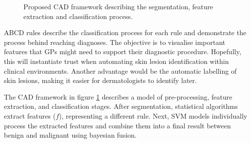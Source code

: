 \begin{figure}
\caption{Proposed CAD framework describing the segmentation, feature extraction  and classification process.} \label{model}
\end{figure}

ABCD rules describe the classification process for each rule and demonstrate the process behind reaching diagnoses. The objective is to visualise important features that GPs might need to support their diagnostic procedure. Hopefully, this will instantiate trust when automating skin lesion identification within clinical environments. Another advantage would be the automatic labelling of skin lesions, making it easier for dermatologists to identify later.

The CAD framework in figure \ref{model} describes a model of pre-processing, feature extraction, and classification stages. After segmentation, statistical algorithms extract features ($f$), representing a different rule. Next, SVM models individually process the extracted features and combine them into a final result between benign and malignant using bayesian fusion.

